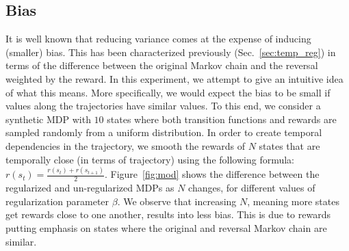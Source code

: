 \documentclass{article}
\newcommand{\param}{\beta}
\begin{document}
\subsection{Bias}
\label{sec:expe:bias}

It is well known that reducing variance comes at the expense of inducing (smaller) bias.
This has been characterized previously (Sec.~\ref{sec:temp_reg}) in terms of the difference between the original Markov chain and the reversal weighted by the reward. In this experiment, we attempt to give an intuitive idea of what this means. More specifically, we would expect the bias to be small if values along the trajectories have similar values.
To this end, we consider a synthetic MDP with $10$ states where both transition functions and rewards are sampled randomly from a uniform distribution. In order to create temporal dependencies in the trajectory, we smooth the rewards of $N$ states that are temporally close (in terms of trajectory) using the following formula: $ r(s_t) = \frac{r(s_t) + r(s_{t+1})}{2}$.
Figure~\ref{fig:mod} shows the difference between the regularized and un-regularized MDPs as $N$ changes, for different values of regularization parameter $\param$.
We observe that increasing $N$, meaning more states get rewards close to one another, results into less bias. This is due to rewards putting emphasis on states where the original and reversal Markov chain are similar.
\end{document}
